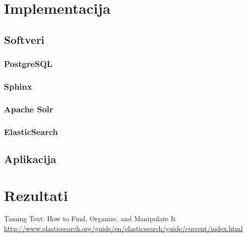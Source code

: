 \documentclass[11pt]{scrreprt}
\begin{document}
\chapter{Implementacija}

\section{Softveri}

\subsection{PostgreSQL}

\subsection{Sphinx}

\subsection{Apache Solr}

\subsection{ElasticSearch}

\section{Aplikacija}

\chapter{Rezultati}

\begin{thebibliography}{99}
   Taming Text: How to Find, Organize, and Manipulate It
   \url{http://www.elasticsearch.org/guide/en/elasticsearch/guide/current/index.html}
\end{thebibliography}
\end{document}
